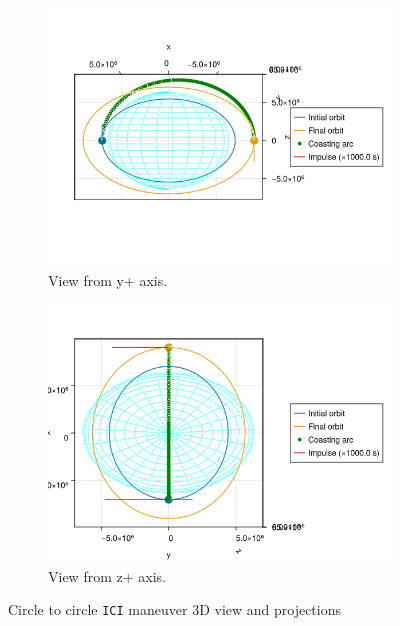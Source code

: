 \begin{figure}[htbp]
\begin{subfigure}{0.49\linewidth}
        \includegraphics[width=\linewidth]{../results/j2/hohmann/ICI_y+.png}
        \caption{View from y+ axis.}
    \end{subfigure}
    \begin{subfigure}{0.49\linewidth}
        \includegraphics[width=\linewidth]{../results/j2/hohmann/ICI_z+.png}
        \caption{View from z+ axis.}
    \end{subfigure}
    \caption{Circle to circle \texttt{ICI} maneuver 3D view and projections}
    \label{fig:j2_c2c_ICI_figs}
\end{figure}

